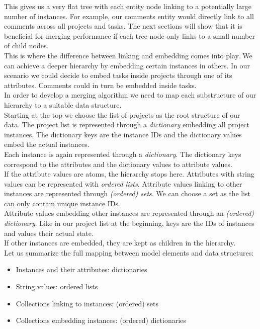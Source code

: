 This gives us a very flat tree with each entity node linking to a potentially large number of instances.
For example, our comments entity would directly link to all comments across all projects and tasks.
The next sections will show that it is beneficial for merging performance if each tree node only links to a small number of child nodes.\\
This is where the difference between linking and embedding comes into play.
We can achieve a deeper hierarchy by embedding certain instances in others.
In our scenario we could decide to embed tasks inside projects through one of its attributes.
Comments could in turn be embedded inside tasks.\\
In order to develop a merging algorithm we need to map each substructure of our hierarchy to a suitable data structure.\\
Starting at the top we choose the list of projects as the root structure of our data.
The project list is represented through a \emph{dictionary} embedding all project instances.
The dictionary keys are the instance IDs and the dictionary values embed the actual instances.\\
Each instance is again represented through a \emph{dictionary}.
The dictionary keys correspond to the attributes and the dictionary values to attribute values.\\
If the attribute values are atoms, the hierarchy stops here.
Attributes with string values can be represented with \emph{ordered lists}.
Attribute values linking to other instances are represented through \emph{(ordered) sets}.
We can choose a set as the list can only contain unique instance IDs.\\
Attribute values embedding other instances are represented through an \emph{(ordered) dictionary}.
Like in our project list at the beginning, keys are the IDs of instances and values their actual state.\\
If other instances are embedded, they are kept as children in the hierarchy.\\

Let us summarize the full mapping between model elements and data structures:

\begin{itemize}
\item Instances and their attributes: dictionaries
\item String values: ordered lists
\item Collections linking to instances: (ordered) sets
\item Collections embedding instances: (ordered) dictionaries
\end{itemize}

